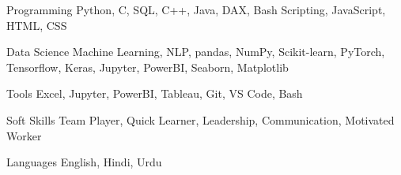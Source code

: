 

\begin{cvskills}
	
	\cvskill
	{Programming} %
	{Python, C,  SQL, C++, Java, DAX, Bash Scripting, JavaScript, HTML, CSS} %
	
	\cvskill
	{Data Science} %
	{Machine Learning,  NLP, pandas, NumPy, Scikit-learn,  PyTorch, Tensorflow, Keras, Jupyter, PowerBI, Seaborn, Matplotlib } %
	
	\cvskill
	{Tools} %
	{Excel, Jupyter, PowerBI, Tableau, Git, VS Code, Bash} %
	
	\cvskill
	{Soft Skills} %
	{Team Player, Quick Learner, Leadership, Communication, Motivated Worker} %
	
	\cvskill
	{Languages} %
	{English, Hindi, Urdu} %
	
\end{cvskills}

